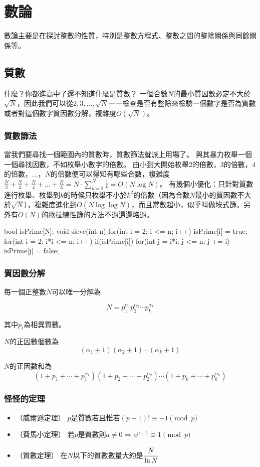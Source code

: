 \chapter{數論 \uppercase\expandafter{}}
數論主要是在探討整數的性質，特別是整數方程式、整數之間的整除關係與同餘關係等。

\section{質數}
什麼？你都進高中了還不知道什麼是質數？
一個合數$N$的最小質因數必定不大於$\sqrt{N}$，因此我們可以從$2,3,\dots,\sqrt{N}$一一檢查是否有整除來檢驗一個數字是否為質數或者對這個數字質因數分解，複雜度$O(\sqrt{N})$。

\subsection{質數篩法}
當我們要尋找一個範圍內的質數時，質數篩法就派上用場了。
與其暴力枚舉一個一個尋找因數，不如枚舉小數字的倍數。
由小到大開始枚舉$2$的倍數，$3$的倍數，$4$的倍數，$\dots$，$N$的倍數便可以得知有哪些合數，複雜度$\frac{N}{2}+\frac{N}{3}+\frac{N}{4}+\dots+\frac{N}{N} = N \cdot \sum_{k=2}^N \frac{1}{k} = O(N\log N)$。
有幾個小優化：只針對質數進行枚舉、枚舉到$k$的時候只枚舉不小於$k^2$的倍數（因為合數$N$最小的質因數不大於$\sqrt{N}$），複雜度進化到$O(N \log \log N)$，而且常數超小，似乎叫做埃式篩。另外有$O(N)$的歐拉線性篩的方法不過這邊略過。
\begin{C++}
bool isPrime[N];
void sieve(int n) {
	for(int i = 2; i <= n; i++) isPrime[i] = true;
	for(int i = 2; i*i <= n; i++) if(isPrime[i]) {
		for(int j = i*i; j <= n; j += i) {
			isPrime[j] = false;
		}
	}
}
\end{C++}

\subsection{質因數分解}
每一個正整數$N$可以唯一分解為

$$
N = p_1^{\alpha_1}p_2^{\alpha_2}\cdots p_k^{\alpha_k}
$$

其中$p_i$為相異質數。

$N$的正因數個數為
$$(\alpha_1+1)(\alpha_2+1)\cdots(\alpha_k+1)$$

$N$的正因數和為
$$(1+p_1+\cdots+p_1^{\alpha_1})(1+p_2+\cdots+p_2^{\alpha_2}) \cdots (1+p_k+\cdots+p_k^{\alpha_k})$$

\subsection{怪怪的定理}
\begin{itemize}
\item （威爾遜定理） $p$是質數若且惟若$(p-1)! \equiv -1 \pmod p$
\item （費馬小定理） 若$p$是質數則$a \neq 0 \Rightarrow a^{p-1} \equiv 1 \pmod p$
\item （質數定理） 在$N$以下的質數數量大約是$\cfrac{N}{\ln N}$
\end{itemize}

